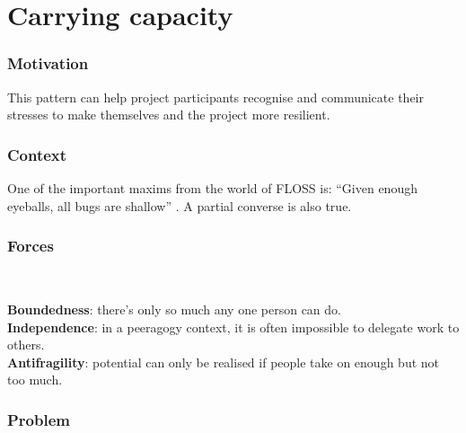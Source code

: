 \section{Carrying capacity}\label{sec:Carrying capacity}

\subsubsection*{Motivation} This pattern can help project participants recognise and communicate their stresses to make themselves and the project  more resilient.



\subsubsection*{Context}

One of the important maxims from the world of FLOSS is:
``Given enough eyeballs, all bugs are shallow'' \cite[p.~30]{raymond2001cathedral}.
A partial converse is also true.

\subsubsection*{Forces}~
\parbox[t]{.85\textwidth}{
\textbf{Boundedness}: there's only so much any one person can do.\\
\textbf{Independence}: in a peeragogy context, it is often impossible to delegate work to others.\\
\textbf{Antifragility}: potential can only be realised if people take on enough but not too much.
}

\subsubsection*{Problem}

